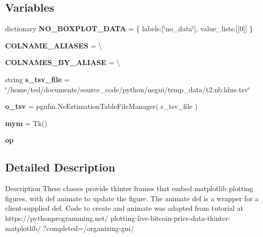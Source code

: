 \subsection*{Variables}
\begin{DoxyCompactItemize}
\item 
dictionary {\bfseries N\+O\+\_\+\+B\+O\+X\+P\+L\+O\+T\+\_\+\+D\+A\+TA} = \{ \textquotesingle{}labels\textquotesingle{}\+:\mbox{[}\char`\"{}no\+\_\+data\char`\"{}\mbox{]}, \textquotesingle{}value\+\_\+lists\textquotesingle{}\+:\mbox{[}\mbox{[}0\mbox{]}\mbox{]} \}\hypertarget{namespacenegui_1_1pgplottingframe_a591ae4ffafcd932f43e817dae9139c77}{}\label{namespacenegui_1_1pgplottingframe_a591ae4ffafcd932f43e817dae9139c77}

\item 
{\bfseries C\+O\+L\+N\+A\+M\+E\+\_\+\+A\+L\+I\+A\+S\+ES} = \textbackslash{}\hypertarget{namespacenegui_1_1pgplottingframe_ae0c2e66e22cc916ce736129e49341217}{}\label{namespacenegui_1_1pgplottingframe_ae0c2e66e22cc916ce736129e49341217}

\item 
{\bfseries C\+O\+L\+N\+A\+M\+E\+S\+\_\+\+B\+Y\+\_\+\+A\+L\+I\+A\+SE} = \textbackslash{}\hypertarget{namespacenegui_1_1pgplottingframe_a653eeff61bc9943fe19e7b8202c50ba8}{}\label{namespacenegui_1_1pgplottingframe_a653eeff61bc9943fe19e7b8202c50ba8}

\item 
string {\bfseries s\+\_\+tsv\+\_\+file} = \char`\"{}/home/ted/documents/source\+\_\+code/python/negui/temp\+\_\+data/t2.\+nb.\+ldne.\+tsv\char`\"{}\hypertarget{namespacenegui_1_1pgplottingframe_af9272d9dfd4bf56466efa5df67ab65fe}{}\label{namespacenegui_1_1pgplottingframe_af9272d9dfd4bf56466efa5df67ab65fe}

\item 
{\bfseries o\+\_\+tsv} = pgnfm.\+Ne\+Estimation\+Table\+File\+Manager( s\+\_\+tsv\+\_\+file )\hypertarget{namespacenegui_1_1pgplottingframe_ad53b00e56803a05213b0688a3711a493}{}\label{namespacenegui_1_1pgplottingframe_ad53b00e56803a05213b0688a3711a493}

\item 
{\bfseries mym} = Tk()\hypertarget{namespacenegui_1_1pgplottingframe_ace186483eed24927619d264947740b63}{}\label{namespacenegui_1_1pgplottingframe_ace186483eed24927619d264947740b63}

\item 
{\bfseries op}
\end{DoxyCompactItemize}


\subsection{Detailed Description}
\begin{DoxyVerb}Description
These classes provide tkinter frames that embed 
matplotlib plotting figures, with def animate
to update the figure.  The animate def is 
a wrapper for a client-supplied def.  Code to create
and animate was adapted from tutorial at
https://pythonprogramming.net/
plotting-live-bitcoin-price-data-tkinter-matplotlib/
?completed=/organizing-gui/
\end{DoxyVerb}
 

